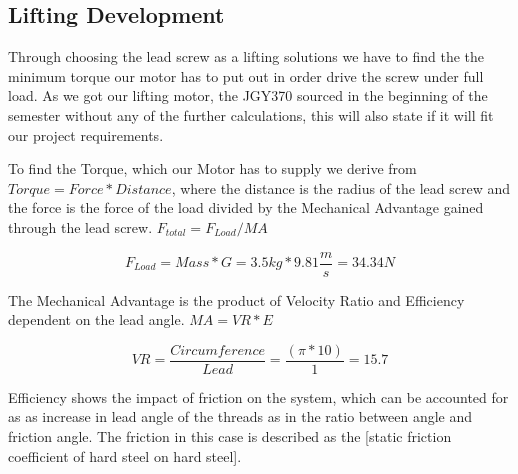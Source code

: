 \documentclass[../report.tex]{subfiles}
\begin{document}
\maketitle

\subsection{Lifting Development}
Through choosing the lead screw as a lifting solutions we have to find the
the minimum torque our motor has to put out in order drive the screw under full load.
As we got our lifting motor, the JGY370 sourced in the beginning of the semester without 
any of the further calculations, this will also state if it will fit our project requirements.


To find the Torque, which our Motor has to supply we derive from $Torque=Force*Distance$, where the 
distance is the radius of the lead screw and the force is the force of the load divided by the Mechanical 
Advantage gained through the lead screw. $F_{total}=F_{Load}/MA$

\[F_{Load}=Mass*G=3.5kg*9.81\frac{m}{s}=34.34N\]

The Mechanical Advantage is the product of Velocity Ratio and Efficiency dependent on the lead 
angle. $MA=VR*E$ 

\[VR=\frac{Circumference}{Lead}=\frac{(\pi*10)}{1}=15.7\]

Efficiency shows the impact of friction on the system, which can be accounted for as as increase in lead angle of the threads 
as in the ratio between angle and friction angle. The friction in this case is described as the \cite{friction_coefficient}[static 
friction coefficient of hard steel on hard steel]. 
\end{document}

